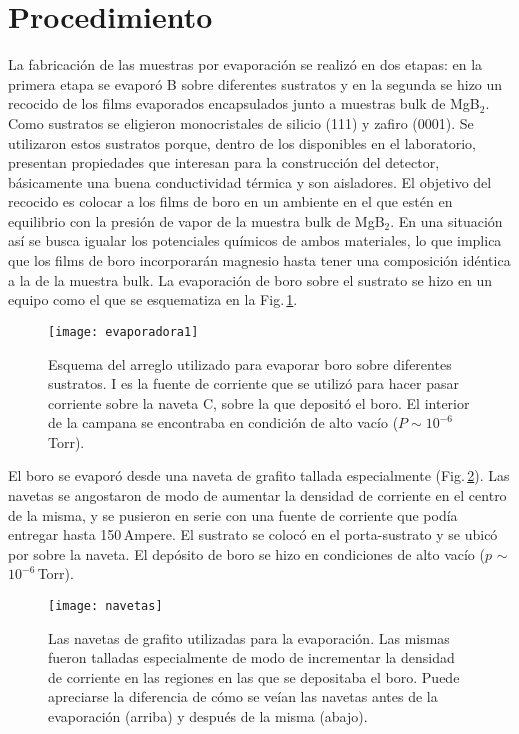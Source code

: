 \section{Procedimiento}\label{S:evapproc}
La fabricación de las muestras por evaporación se realizó en dos etapas: en la primera etapa se evaporó B sobre diferentes sustratos y en la segunda se hizo un recocido de los films evaporados encapsulados junto a muestras bulk de MgB$_2$. Como sustratos se eligieron monocristales de silicio (111) y zafiro (0001). Se utilizaron estos sustratos porque, dentro de los disponibles en el laboratorio, presentan propiedades que interesan para la construcción del detector, básicamente una buena conductividad térmica y son aisladores\cite{Ekin2006}. El objetivo del recocido es colocar a los films de boro en un ambiente en el que estén en equilibrio con la presión de vapor de la muestra bulk de MgB$_2$\cite{Barrabas2011}. En una situación así se busca igualar los potenciales químicos de ambos materiales, lo que implica que los films de boro incorporarán magnesio hasta tener una composición idéntica a la de la muestra bulk. La evaporación de boro sobre el sustrato se hizo en un equipo como el que se esquematiza en la Fig.\,\ref{fig:eva}.
\begin{figure}[tbh!]
 \begin{center}
    \texttt{[image: evaporadora1]}
  \end{center}
  \caption[Esquema del arreglo utilizado para evaporar boro sobre diferentes sustratos.]{Esquema del arreglo utilizado para evaporar boro sobre diferentes sustratos. I es la fuente de corriente
que se utilizó para hacer pasar corriente sobre la naveta C, sobre la que depositó el boro. El interior de la campana se encontraba en condición de alto vacío ($P \sim 10^{-6}$\,Torr).}
\label{fig:eva}
\end{figure}
El boro se evaporó desde una naveta de grafito tallada especialmente (Fig.\,\ref{fig:nav}). Las navetas se angostaron de modo de aumentar la densidad de corriente en el centro de la misma, y se pusieron en serie con una fuente de corriente que podía entregar hasta 150\,Ampere. El sustrato se colocó en el porta-sustrato y se ubicó por sobre la naveta. El depósito de boro se hizo en condiciones de alto vacío ($p$ $\sim$ $10^{-6}$\,Torr).
\begin{figure}[tbh!]
 \begin{center}
    \texttt{[image: navetas]}
  \end{center}
  \caption[Las navetas de grafito utilizadas para la evaporación.]{Las navetas de grafito utilizadas para la evaporación. Las mismas fueron talladas especialmente
de modo de incrementar la densidad de corriente en las regiones en las que se depositaba el boro. Puede apreciarse
la diferencia de cómo se veían las navetas antes de la evaporación (arriba) y después de la misma (abajo).}
  \label{fig:nav}
\end{figure}
